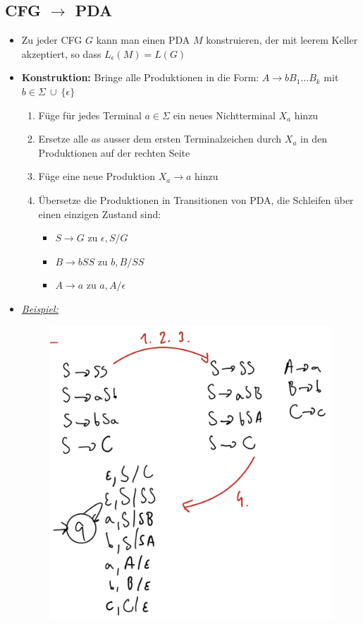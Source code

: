 \documentclass[ieeetran]{article}
\begin{document}
\subsection{CFG $\rightarrow$ PDA} %
\label{sub:_cFG_rightarrow_pDA}
\begin{itemize}
	\item Zu jeder CFG $G$ kann man einen PDA $M$ konstruieren, der mit leerem Keller akzeptiert, so dass $L_{\epsilon}(M) = L(G)$
\item \textbf{Konstruktion:} Bringe alle Produktionen in die Form: $A \rightarrow bB_1 \ldots B_k$ mit $b \in \Sigma \ \cup \ \{\epsilon\}$
	\begin{enumerate}
	\item Füge für jedes Terminal $a\in\Sigma$ ein neues Nichtterminal $X_a$ hinzu
	\item Ersetze alle $a$s ausser dem ersten Terminalzeichen durch $X_a$ in den Produktionen auf der rechten Seite
	\item Füge eine neue Produktion $X_a \rightarrow a$ hinzu
	\item Übersetze die Produktionen in Transitionen von PDA, die Schleifen über einen einzigen Zustand sind:
		\begin{itemize}
			\item $S \rightarrow G$ zu $\epsilon, S / G$
			\item $B \rightarrow bSS$ zu $b, B/SS$
			\item $A \rightarrow a$ zu $a, A/\epsilon$

		\end{itemize}
	\end{enumerate}

\item \textit{\underline{Beispiel:}}
	\begin{figure}[h!]
	  \centering
	  \includegraphics[width=0.3\linewidth]{cfgtopda}
	  \label{fig:cfgtopda}
	\end{figure}
\end{itemize}
\end{document}

